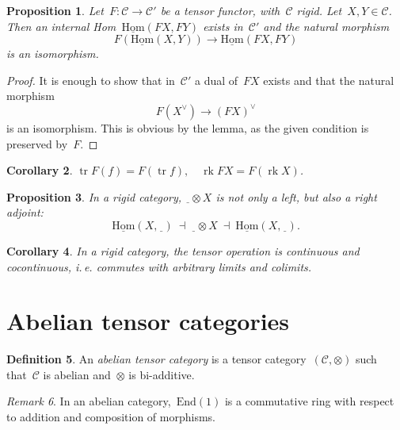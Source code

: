 \documentclass[a4paper,english,12pt]{scrartcl}
\theoremstyle{definition}
\newtheorem{defn}{Definition}[section]
\theoremstyle{plain}
\newtheorem{prop}[defn]{Proposition}
\newtheorem{cor}[defn]{Corollary}
\theoremstyle{remark}
\newtheorem{rem}[defn]{Remark}
\newcommand{\C}{\mathcal{C}}
\renewcommand{\_}{\mathpunct{.}\,}
\newcommand{\?}{\,{:}\,}
\newcommand{\Hom}{\underline{\mathrm{Hom}}}
\newcommand{\End}{\mathrm{End}}
\newcommand{\freist}{\underline{\ \ }}
\newcommand{\tr}{\operatorname{tr}}
\newcommand{\rk}{\operatorname{rk}}
\begin{document}
\begin{prop}Let~$F : \C \to \C'$ be a tensor functor, with~$\C$ rigid.
Let~$X,Y \in \C$. Then an internal Hom~$\Hom(FX,FY)$ exists in~$\C'$ and the
natural morphism
\[ F(\Hom(X,Y)) \longrightarrow \Hom(FX,FY) \]
is an isomorphism.\end{prop}
\begin{proof}It is enough to show that in~$\C'$ a dual of~$FX$ exists and that
the natural morphism
\[ F(X^\vee) \longrightarrow (FX)^\vee \]
is an isomorphism. This is obvious by the lemma, as the given condition is
preserved by~$F$.\end{proof}

\begin{cor}$\tr F(f) = F(\tr f), \quad \rk FX = F(\rk X)$.\end{cor}

\begin{prop}In a rigid category, $\freist \otimes X$ is not only a left, but
also a right adjoint:
\[ \Hom(X,\freist) \ \dashv\  \freist \otimes X \ \dashv\  \Hom(X,\freist). \]
\end{prop}
\begin{cor}In a rigid category, the tensor operation is continuous and
cocontinuous, i.\,e. commutes with arbitrary limits and colimits.\end{cor}


\section{Abelian tensor categories}

\begin{defn}An \emph{abelian tensor category} is a tensor
category~$(\C,\otimes)$ such that~$\C$ is abelian and~$\otimes$ is
bi-additive.\end{defn}

\begin{rem}In an abelian category,~$\End(1)$ is a commutative ring with respect
to addition and composition of morphisms.\end{rem}
\end{document}
